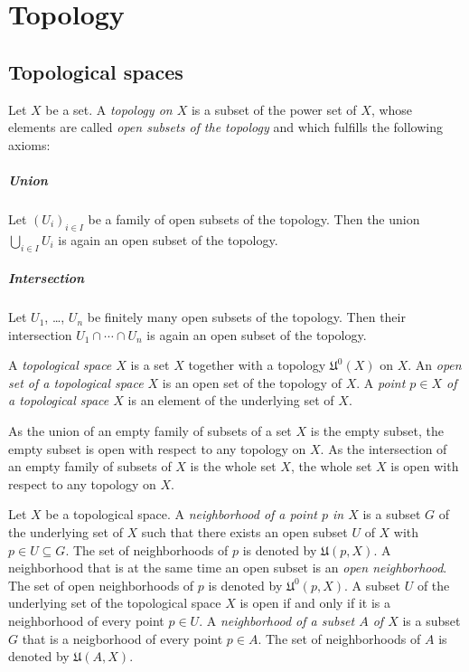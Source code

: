 \chapter{Topology}

\section{Topological spaces}
\label{sec:topological_spaces}

\begin{dfn}
  Let $X$ be a set. A \emph{topology on $X$} is a subset of the
  power set of $X$, whose elements are called \emph{open subsets of the topology}
  and which fulfills the following axioms:
  
  \paragraph{Union}
  Let $(U_i)_{i \in I}$ be a family of open subsets of the topology. Then the
  union $\bigcup_{i \in I} U_i$ is again an open subset of the topology.
  
  \paragraph{Intersection}
  Let $U_1$, \dots, $U_n$ be finitely many open subsets of the topology. Then
  their intersection $U_1 \cap \dotsb \cap U_n$
  is again an open subset of the topology.
  
  A \emph{topological space $X$} is a set $X$ together with a topology $\mathfrak U^0(X)$
  on $X$. An \emph{open set of a topological space $X$} is an open set of the topology
  of $X$.
  A \emph{point $p \in X$ of a topological space $X$} is an element of the
  underlying set of $X$.
\end{dfn}

As the union of an empty family of subsets of a set $X$ is the empty subset,
the empty subset is open with respect to any topology on $X$.
As the intersection of an empty family of subsets of $X$ is the whole set $X$,
the whole set $X$ is open with respect to any topology on $X$.

Let $X$ be a topological space.
A \emph{neighborhood of a point $p$ in $X$} is a subset $G$
of the underlying set of $X$ such that there exists an open subset $U$ of $X$ with
$p \in U \subseteq G$. The set of neighborhoods of $p$ is denoted by
$\mathfrak U(p, X)$. A neighborhood that is at the same time an open subset
is an \emph{open neighborhood}. The set of open neighborhoods of $p$ is
denoted by $\mathfrak U^0(p, X)$. A subset $U$ of the underlying set of the
topological space $X$ is open if and only if it is a neighborhood of every point
$p \in U$. A \emph{neighborhood of a subset $A$ of $X$} is a subset $G$ that is
a neigborhood of every point $p \in A$. The set of neighborhoods of $A$ is denoted
by $\mathfrak U(A, X)$.

